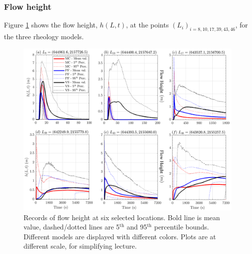 \documentclass{article}
\begin{document}
\subsubsection{Flow height}
Figure \ref{fig:Colima-H} shows the flow height, $h(L,t)$, at the points $(L_i)_{i=8,10,17,39,43,46}$, for the three rheology models.
\begin{figure}[H]
         \centering
        \includegraphics[width=1\textwidth]{BAF_VolcanDeColima/LocalMeasurments/Height.png}
        \caption{Records of flow height at six selected locations. Bold line is mean value, dashed/dotted lines are 5$^{\mathrm{th}}$ and 95$^{\mathrm{th}}$ percentile bounds. Different models are displayed with different colors. Plots are at different scale, for simplifying lecture.}
        \label{fig:Colima-H}
\end{figure}
\end{document}
